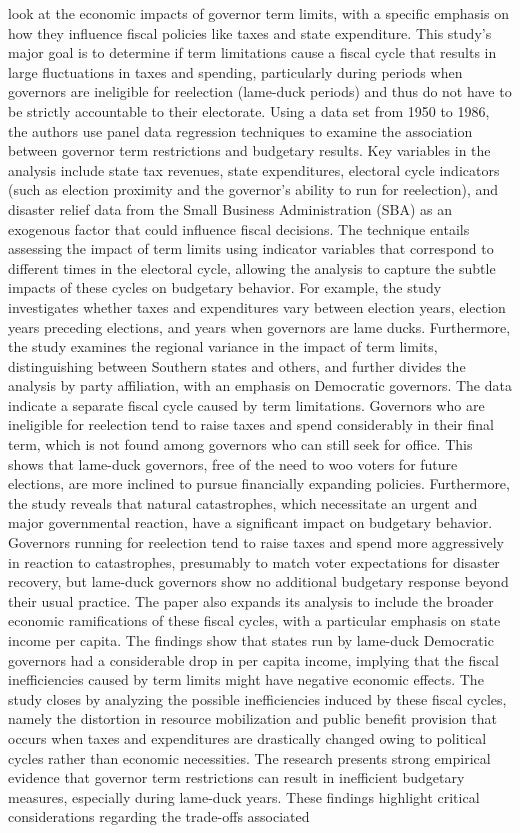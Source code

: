  look at the economic impacts of governor term limits, with a specific emphasis on how they influence fiscal policies like taxes and state expenditure. This study's major goal is to determine if term limitations cause a fiscal cycle that results in large fluctuations in taxes and spending, particularly during periods when governors are ineligible for reelection (lame-duck periods) and thus do not have to be strictly accountable to their electorate. Using a data set from 1950 to 1986, the authors use panel data regression techniques to examine the association between governor term restrictions and budgetary results. Key variables in the analysis include state tax revenues, state expenditures, electoral cycle indicators (such as election proximity and the governor's ability to run for reelection), and disaster relief data from the Small Business Administration (SBA) as an exogenous factor that could influence fiscal decisions. The technique entails assessing the impact of term limits using indicator variables that correspond to different times in the electoral cycle, allowing the analysis to capture the subtle impacts of these cycles on budgetary behavior. For example, the study investigates whether taxes and expenditures vary between election years, election years preceding elections, and years when governors are lame ducks. Furthermore, the study examines the regional variance in the impact of term limits, distinguishing between Southern states and others, and further divides the analysis by party affiliation, with an emphasis on Democratic governors. The data indicate a separate fiscal cycle caused by term limitations. Governors who are ineligible for reelection tend to raise taxes and spend considerably in their final term, which is not found among governors who can still seek for office. This shows that lame-duck governors, free of the need to woo voters for future elections, are more inclined to pursue financially expanding policies. Furthermore, the study reveals that natural catastrophes, which necessitate an urgent and major governmental reaction, have a significant impact on budgetary behavior. Governors running for reelection tend to raise taxes and spend more aggressively in reaction to catastrophes, presumably to match voter expectations for disaster recovery, but lame-duck governors show no additional budgetary response beyond their usual practice. The paper also expands its analysis to include the broader economic ramifications of these fiscal cycles, with a particular emphasis on state income per capita. The findings show that states run by lame-duck Democratic governors had a considerable drop in per capita income, implying that the fiscal inefficiencies caused by term limits might have negative economic effects. The study closes by analyzing the possible inefficiencies induced by these fiscal cycles, namely the distortion in resource mobilization and public benefit provision that occurs when taxes and expenditures are drastically changed owing to political cycles rather than economic necessities. The research presents strong empirical evidence that governor term restrictions can result in inefficient budgetary measures, especially during lame-duck years. These findings highlight critical considerations regarding the trade-offs associated 